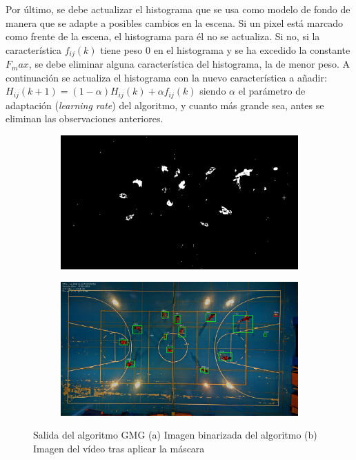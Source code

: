 Por último, se debe actualizar el histograma que se usa como modelo de fondo de manera que se adapte a posibles cambios en la escena. Si un pixel está marcado como frente de la escena, el histograma para él no se actualiza. Si no, si la característica $f_{ij}(k)$ tiene peso 0 en el histograma y se ha excedido la constante $F_max$, se debe eliminar alguna característica del histograma, la de menor peso. A continuación se actualiza el histograma con la nuevo característica a añadir: $H_{ij}(k+1)=(1-\alpha)H_{ij}(k)+\alpha f_{ij}(k)$ siendo $\alpha$ el parámetro de adaptación (\textit{learning rate}) del algoritmo, y cuanto más grande sea, antes se eliminan las observaciones anteriores.

\begin{figure}
\begin{subfigure}{.5\textwidth}
  \centering
  \includegraphics[width=.9\linewidth]{images/GMGsub}
  \caption { }
  \label{fig:GMG1a}
\end{subfigure}%
\begin{subfigure}{.5\textwidth}
  \centering
  \includegraphics[width=.9\linewidth]{images/GMG}
  \caption { }
  \label{fig:GMG1b}
\end{subfigure}
\caption{Salida del algoritmo GMG (a) Imagen binarizada del algoritmo (b) Imagen del vídeo tras aplicar la máscara }
\label{fig:GMG}
\end{figure}

